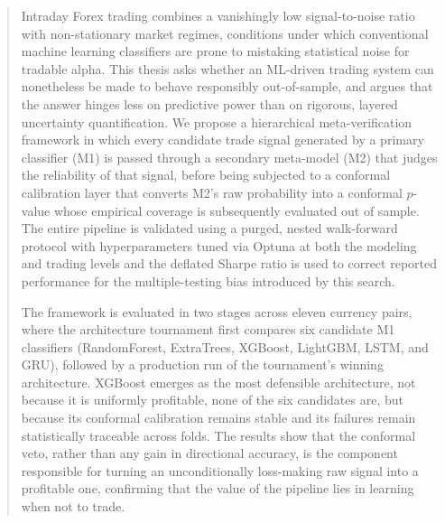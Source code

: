 \documentclass[12pt, a4paper]{article}
\begin{document}
\pagebreak

\setcounter{page}{1}

\begin{abstract}
Intraday Forex trading combines a vanishingly low signal-to-noise ratio with non-stationary market regimes, conditions under which conventional machine learning
classifiers are prone to mistaking statistical noise for tradable alpha. This thesis asks whether an ML-driven trading system can nonetheless be made to behave
responsibly out-of-sample, and argues that the answer hinges less on predictive power than on rigorous, layered uncertainty quantification. We propose a
hierarchical meta-verification framework in which every candidate trade signal generated by a primary classifier (M1) is passed through a secondary meta-model
(M2) that judges the reliability of that signal, before being subjected to a conformal calibration layer that converts M2's raw probability into a conformal 
$p$-value whose empirical coverage is subsequently evaluated out of sample. The entire pipeline is validated using a purged, nested walk-forward
protocol with hyperparameters tuned via Optuna at both the modeling and trading levels and the deflated Sharpe ratio is used to correct reported performance
for the multiple-testing bias introduced by this search.

\medskip

The framework is evaluated in two stages across eleven currency pairs, where the architecture tournament first compares six candidate M1 classifiers (RandomForest,
ExtraTrees, XGBoost, LightGBM, LSTM, and GRU), followed by a production run of the tournament's winning architecture. XGBoost emerges as the most defensible
architecture, not because it is uniformly profitable, none of the six candidates are, but because its conformal calibration remains stable and its failures
remain statistically traceable across folds. The results show that the conformal veto, rather than any gain in directional accuracy, is the component
responsible for turning an unconditionally loss-making raw signal into a profitable one, confirming that the value of the pipeline lies in learning when not
to trade.

\medskip


\end{abstract}
\end{document}
